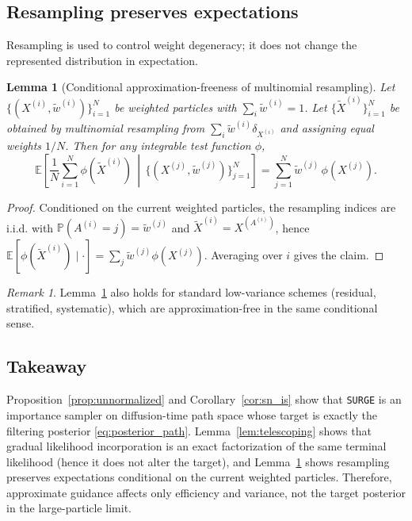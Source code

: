 \documentclass{article}
\newcommand{\E}{\mathbb{E}}
\renewcommand{\P}{{\mathbb{P}}}
\theoremstyle{plain}
\newtheorem{lemma}[theorem]{Lemma}
\theoremstyle{definition}
\theoremstyle{remark}
\newtheorem{remark}[theorem]{Remark}
\begin{document}
\subsection{Resampling preserves expectations}

Resampling is used to control weight degeneracy; it does not change the represented distribution in
expectation.

\begin{lemma}[Conditional approximation-freeness of multinomial resampling]
\label{lem:resampling}
Let $\{(X^{(i)},\tilde w^{(i)})\}_{i=1}^N$ be weighted particles with $\sum_i \tilde w^{(i)}=1$.
Let $\{\tilde X^{(i)}\}_{i=1}^N$ be obtained by multinomial resampling from
$\sum_i \tilde w^{(i)}\delta_{X^{(i)}}$ and assigning equal weights $1/N$.
Then for any integrable test function $\phi$,
\[
\E\!\left[\frac{1}{N}\sum_{i=1}^N \phi(\tilde X^{(i)})
\,\middle|\,
\{(X^{(j)},\tilde w^{(j)})\}_{j=1}^N
\right]
=
\sum_{j=1}^N \tilde w^{(j)}\,\phi(X^{(j)}).
\]
\end{lemma}

\begin{proof}
Conditioned on the current weighted particles, the resampling indices are i.i.d. with
$\P(A^{(i)}=j)=\tilde w^{(j)}$ and $\tilde X^{(i)}=X^{(A^{(i)})}$, hence
$\E[\phi(\tilde X^{(i)})\mid\cdot]=\sum_j \tilde w^{(j)}\phi(X^{(j)})$. Averaging over $i$ gives the claim.
\end{proof}

\begin{remark}
Lemma~\ref{lem:resampling} also holds for standard low-variance schemes (residual, stratified, systematic),
which are approximation-free in the same conditional sense.
\end{remark}

\subsection{Takeaway}

Proposition~\ref{prop:unnormalized} and Corollary~\ref{cor:sn_is} show that \texttt{SURGE} is an
importance sampler on diffusion-time path space whose target is exactly the filtering posterior
\eqref{eq:posterior_path}. Lemma~\ref{lem:telescoping} shows that gradual likelihood incorporation is an
exact factorization of the same terminal likelihood (hence it does not alter the target), and
Lemma~\ref{lem:resampling} shows resampling preserves expectations conditional on the current weighted
particles. Therefore, approximate guidance affects only efficiency and variance, not the target posterior
in the large-particle limit.
\end{document}
